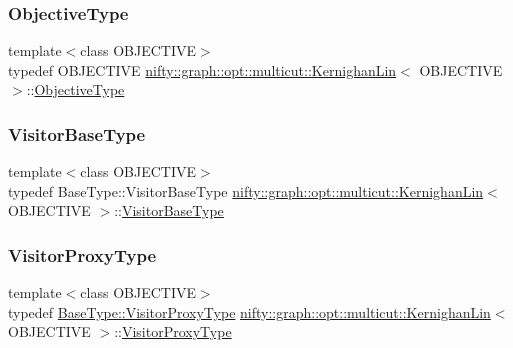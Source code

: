 \subsubsection{\texorpdfstring{Objective\+Type}{ObjectiveType}}
{\footnotesize\ttfamily template$<$class O\+B\+J\+E\+C\+T\+I\+VE$>$ \\
typedef O\+B\+J\+E\+C\+T\+I\+VE \hyperlink{classnifty_1_1graph_1_1opt_1_1multicut_1_1KernighanLin}{nifty\+::graph\+::opt\+::multicut\+::\+Kernighan\+Lin}$<$ O\+B\+J\+E\+C\+T\+I\+VE $>$\+::\hyperlink{classnifty_1_1graph_1_1opt_1_1multicut_1_1KernighanLin_aa5a1c5a577ff9d17db32d5871da3ed45}{Objective\+Type}}

\mbox{\label{classnifty_1_1graph_1_1opt_1_1multicut_1_1KernighanLin_a04b6ab578786c0fae38522f49a6a9686}} 
\subsubsection{\texorpdfstring{Visitor\+Base\+Type}{VisitorBaseType}}
{\footnotesize\ttfamily template$<$class O\+B\+J\+E\+C\+T\+I\+VE$>$ \\
typedef Base\+Type\+::\+Visitor\+Base\+Type \hyperlink{classnifty_1_1graph_1_1opt_1_1multicut_1_1KernighanLin}{nifty\+::graph\+::opt\+::multicut\+::\+Kernighan\+Lin}$<$ O\+B\+J\+E\+C\+T\+I\+VE $>$\+::\hyperlink{classnifty_1_1graph_1_1opt_1_1multicut_1_1KernighanLin_a04b6ab578786c0fae38522f49a6a9686}{Visitor\+Base\+Type}}

\mbox{\label{classnifty_1_1graph_1_1opt_1_1multicut_1_1KernighanLin_a54f867c080088605f153f5dd8b8413f4}} 
\subsubsection{\texorpdfstring{Visitor\+Proxy\+Type}{VisitorProxyType}}
{\footnotesize\ttfamily template$<$class O\+B\+J\+E\+C\+T\+I\+VE$>$ \\
typedef \hyperlink{classnifty_1_1graph_1_1opt_1_1common_1_1SolverBase_ad209b469b3bc9fc0fc14e9fed4d09075}{Base\+Type\+::\+Visitor\+Proxy\+Type} \hyperlink{classnifty_1_1graph_1_1opt_1_1multicut_1_1KernighanLin}{nifty\+::graph\+::opt\+::multicut\+::\+Kernighan\+Lin}$<$ O\+B\+J\+E\+C\+T\+I\+VE $>$\+::\hyperlink{classnifty_1_1graph_1_1opt_1_1multicut_1_1KernighanLin_a54f867c080088605f153f5dd8b8413f4}{Visitor\+Proxy\+Type}}

